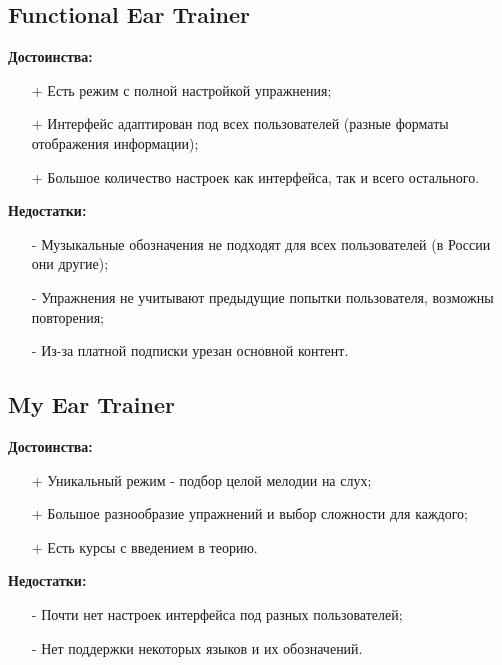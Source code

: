 \subsection[Functional Ear Trainer]{Functional Ear Trainer\cite{Apps2}}
\begin{minipage}[t]{0.45\textwidth}
\textbf{Достоинства:}
\begin{itemize}
  \item[+] Есть режим с полной настройкой упражнения;
  \item[+] Интерфейс адаптирован под всех пользователей (разные форматы отображения информации);
  \item[+] Большое количество настроек как интерфейса, так и всего остального.
\end{itemize}
\end{minipage}
\hfill
\begin{minipage}[t]{0.45\textwidth}
\textbf{Недостатки:}
\begin{itemize}
  \item[-] Музыкальные обозначения не подходят для всех пользователей (в России они другие);
  \item[-] Упражнения не учитывают предыдущие попытки пользователя, возможны повторения;
  \item[-] Из-за платной подписки урезан основной контент.
\end{itemize}
\end{minipage}

\subsection[My Ear Trainer]{My Ear Trainer\cite{Apps3}}
\begin{minipage}[t]{0.45\textwidth}
\textbf{Достоинства:}
\begin{itemize}
  \item[+] Уникальный режим - подбор целой мелодии на слух;
  \item[+] Большое разнообразие упражнений и выбор сложности для каждого;
  \item[+] Есть курсы с введением в теорию.
\end{itemize}
\end{minipage}
\hfill
\begin{minipage}[t]{0.45\textwidth}
\textbf{Недостатки:}
\begin{itemize}
  \item[-] Почти нет настроек интерфейса под разных пользователей;
  \item[-] Нет поддержки некоторых языков и их обозначений.
\end{itemize}
\end{minipage}


